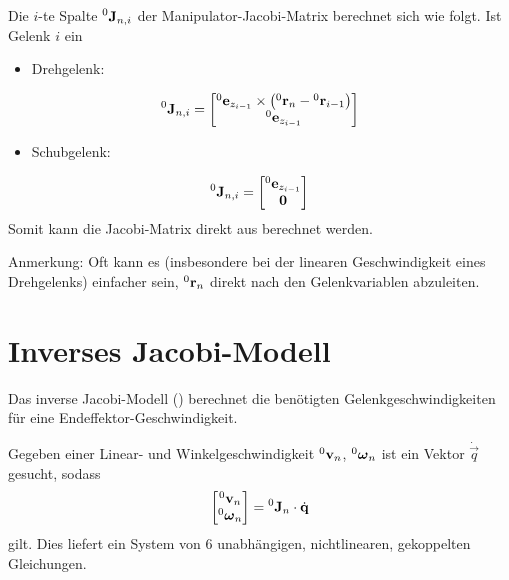 			Die \(i\)-te Spalte \( \prescript{0}{}{\boldsymbol{\mathrm{J}}}_{n, i} \) der Manipulator-Jacobi-Matrix berechnet sich wie folgt. Ist Gelenk \(i\) ein
			\begin{itemize}
				\item Drehgelenk:
			\end{itemize}
			\begin{equation*}
				\prescript{0}{}{\boldsymbol{\mathrm{J}}}_{n, i} =
					\begin{bmatrix}
						\prescript{0}{}{\boldsymbol{\mathrm{e}}}_{z_{i - 1}} \times \big(\! \prescript{0}{}{\boldsymbol{\mathrm{r}}}_n - \prescript{0}{}{\boldsymbol{\mathrm{r}}}_{i - 1} \big) \\
						\prescript{0}{}{\boldsymbol{\mathrm{e}}}_{z_{i - 1}}
					\end{bmatrix}
			\end{equation*}
			\begin{itemize}
				\item Schubgelenk:
			\end{itemize}
			\begin{equation*}
				\prescript{0}{}{\boldsymbol{\mathrm{J}}}_{n, i} =
					\begin{bmatrix}
						\prescript{0}{}{\boldsymbol{\mathrm{e}}}_{z_{i - 1}} \\
						\boldsymbol{\mathrm{0}}
					\end{bmatrix}
			\end{equation*}
			Somit kann die Jacobi-Matrix direkt aus \DIRKIN berechnet werden.
			
			Anmerkung: Oft kann es (insbesondere bei der linearen Geschwindigkeit eines Drehgelenks) einfacher sein, \( \prescript{0}{}{\boldsymbol{\mathrm{r}}}_n \) direkt nach den Gelenkvariablen abzuleiten.

	\section{Inverses Jacobi-Modell}
		Das inverse Jacobi-Modell (\INVKIN) berechnet die benötigten Gelenkgeschwindigkeiten für eine Endeffektor-Geschwindigkeit.

		Gegeben einer Linear- und Winkelgeschwindigkeit \( \prescript{0}{}{\boldsymbol{\mathrm{v}}}_n \), \( \prescript{0}{}{\boldsymbol{\mathrm{\omega}}}_n \) ist ein Vektor \( \dot{\vec{q}} \) gesucht, sodass
		\begin{equation*}
			\begin{bmatrix}
				\prescript{0}{}{\boldsymbol{\mathrm{v}}}_n \\
				\prescript{0}{}{\boldsymbol{\mathrm{\omega}}}_n
			\end{bmatrix}
			=
			\prescript{0}{}{\boldsymbol{\mathrm{J}}}_n \cdot \dot{\boldsymbol{\mathrm{q}}}
		\end{equation*}
		gilt. Dies liefert ein System von \(6\) unabhängigen, nichtlinearen, gekoppelten Gleichungen.


